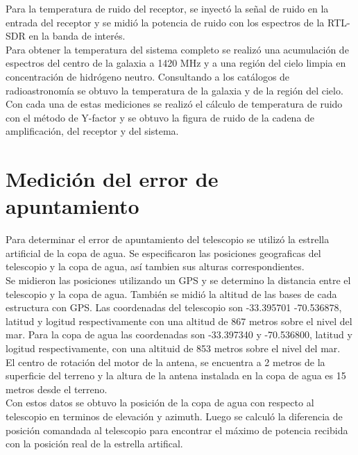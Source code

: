 Para la temperatura de ruido del receptor, se inyectó la señal de ruido en la entrada del receptor y se midió la potencia de ruido con los espectros de la RTL-SDR en la banda de interés.\\

Para obtener la temperatura del sistema completo se realizó una acumulación de espectros del centro de la galaxia a 1420 MHz y a una región del cielo limpia en concentración de hidrógeno neutro. Consultando a los catálogos de radioastronomía se obtuvo la temperatura de la galaxia y de la región del cielo.\\

Con cada una de estas mediciones se realizó el cálculo de temperatura de ruido con el método de Y-factor y se obtuvo la figura de ruido de la cadena de amplificación, del receptor y del sistema.\\


\section{Medición del error de apuntamiento}

Para determinar el error de apuntamiento del telescopio se utilizó la estrella artificial de la copa de agua. Se especificaron las posiciones geograficas del telescopio y la copa de agua, así tambien sus alturas correspondientes.\\

Se midieron las posiciones utilizando un GPS y se determino la distancia entre el telescopio y la copa de agua. También se midió la altitud de las bases de cada estructura con GPS. Las coordenadas del telescopio son -33.395701 -70.536878, latitud y logitud respectivamente con una altitud de 867 metros sobre el nivel del mar. Para la copa de agua las coordenadas son -33.397340 y -70.536800, latitud y logitud respectivamente, con una altituid de 853 metros sobre el nivel del mar.\\

El centro de rotación del motor de la antena, se encuentra a 2 metros de la superficie del terreno y la altura de la antena instalada en la copa de agua es 15 metros desde el terreno.\\

Con estos datos se obtuvo la posición de la copa de agua con respecto al telescopio en terminos de elevación y azimuth. Luego se calculó la diferencia de posición comandada al telescopio para encontrar el máximo de potencia recibida con la posición real de la estrella artifical.\\

